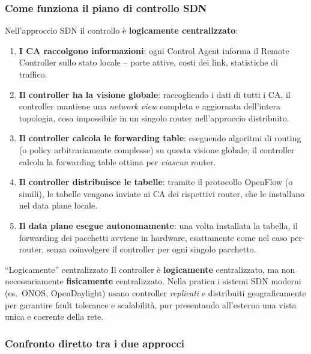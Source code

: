 \documentclass[a4paper,12pt]{report}
\begin{document}
\subsubsection*{Come funziona il piano di controllo SDN}

Nell'approccio SDN il controllo è \textbf{logicamente centralizzato}:

\begin{enumerate}
    \item \textbf{I CA raccolgono informazioni}: ogni Control Agent informa
          il Remote Controller sullo stato locale -- porte attive, costi
          dei link, statistiche di traffico.
    \item \textbf{Il controller ha la visione globale}: raccogliendo i dati
          di tutti i CA, il controller mantiene una \textit{network view}
          completa e aggiornata dell'intera topologia, cosa impossibile in
          un singolo router nell'approccio distribuito.
    \item \textbf{Il controller calcola le forwarding table}: eseguendo
          algoritmi di routing (o policy arbitrariamente complesse) su
          questa visione globale, il controller calcola la forwarding
          table ottima per \emph{ciascun} router.
    \item \textbf{Il controller distribuisce le tabelle}: tramite il
          protocollo OpenFlow (o simili), le tabelle vengono inviate ai CA
          dei rispettivi router, che le installano nel data plane locale.
    \item \textbf{Il data plane esegue autonomamente}: una volta installata
          la tabella, il forwarding dei pacchetti avviene in hardware,
          esattamente come nel caso per-router, senza coinvolgere il
          controller per ogni singolo pacchetto.
\end{enumerate}

\begin{notebox}{``Logicamente'' centralizzato}
Il controller è \textbf{logicamente} centralizzato, ma non necessariamente
\textbf{fisicamente} centralizzato. Nella pratica i sistemi SDN moderni
(es.\ ONOS, OpenDaylight) usano controller \textit{replicati} e
distribuiti geograficamente per garantire fault tolerance e scalabilità,
pur presentando all'esterno una vista unica e coerente della rete.
\end{notebox}

\subsubsection*{Confronto diretto tra i due approcci}
\end{document}
